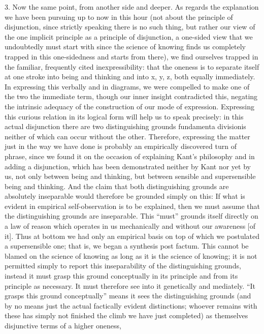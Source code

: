 3. Now the same point, from another side and deeper.
As regards the explanation we have been
pursuing up to now in this hour
(not about the principle of disjunction,
since strictly speaking there is no such thing,
but rather our view of the one implicit principle
as a principle of disjunction,
a one-sided view that we undoubtedly must start with
since the science of knowing finds us completely trapped
in this one-sidedness and starts from there),
we find ourselves trapped in the familiar,
frequently cited inexpressibility:
that the oneness is to separate itself
at one stroke into being and thinking
and into x, y, z, both equally immediately.
In expressing this verbally and in diagrams,
we were compelled to make one of the two the immediate term,
though our inner insight contradicted this,
negating the intrinsic adequacy of
the construction of our mode of expression.
Expressing this curious relation in
its logical form will help us to speak precisely:
in this actual disjunction there are
two distinguishing grounds {fundamenta divisionis}
neither of which can occur without the other.
Therefore, expressing the matter just in the way
we have done is probably an empirically discovered turn of phrase,
since we found it on the occasion of explaining Kant’s philosophy
and in adding a disjunction,
which has been demonstrated
neither by Kant nor yet by us,
not only between being and thinking,
but between sensible and supersensible being and thinking.
And the claim that both distinguishing grounds are
absolutely inseparable would therefore be grounded simply on this:
If what is evident in empirical self-observation is to be explained,
then we must assume that the distinguishing grounds are inseparable.
This “must” grounds itself directly
on a law of reason which operates in us mechanically
and without our awareness [of it].
Thus at bottom we had only an empirical basis
on top of which we postulated a supersensible one;
that is, we began a synthesis post factum.
This cannot be blamed on the science of knowing as
long as it is the science of knowing;
it is not permitted simply to report this
inseparability of the distinguishing grounds,
instead it must grasp this ground conceptually
in its principle and from its principle as necessary.
It must therefore see into it genetically and mediately.
“It grasps this ground conceptually”
means it sees the distinguishing grounds
(and by no means just the actual
factically evident distinctions;
whoever remains with these has simply not
finished the climb we have just completed)
as themselves disjunctive terms of a higher oneness,

